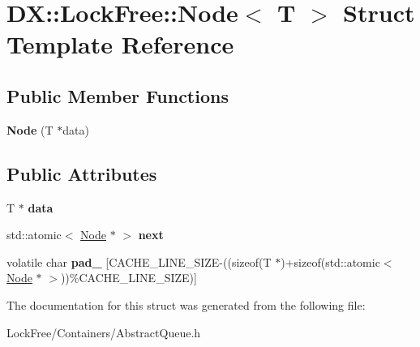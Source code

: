 \hypertarget{struct_d_x_1_1_lock_free_1_1_node}{\section{D\-X\-:\-:Lock\-Free\-:\-:Node$<$ T $>$ Struct Template Reference}
\label{struct_d_x_1_1_lock_free_1_1_node}
}
\subsection*{Public Member Functions}
\begin{DoxyCompactItemize}
\item 
\hypertarget{struct_d_x_1_1_lock_free_1_1_node_a2de3380e5423dc3d4edf17b33e1c4945}{{\bfseries Node} (T $\ast$data)}\label{struct_d_x_1_1_lock_free_1_1_node_a2de3380e5423dc3d4edf17b33e1c4945}

\end{DoxyCompactItemize}
\subsection*{Public Attributes}
\begin{DoxyCompactItemize}
\item 
\hypertarget{struct_d_x_1_1_lock_free_1_1_node_a42c6086397b8cbdecbc50095646d3b05}{T $\ast$ {\bfseries data}}\label{struct_d_x_1_1_lock_free_1_1_node_a42c6086397b8cbdecbc50095646d3b05}

\item 
\hypertarget{struct_d_x_1_1_lock_free_1_1_node_a8e86040f2e9bee28a7a736559cce086c}{std\-::atomic$<$ \hyperlink{struct_d_x_1_1_lock_free_1_1_node}{Node} $\ast$ $>$ {\bfseries next}}\label{struct_d_x_1_1_lock_free_1_1_node_a8e86040f2e9bee28a7a736559cce086c}

\item 
\hypertarget{struct_d_x_1_1_lock_free_1_1_node_a5773af1ce0c200ba7aa747b351b99bf4}{volatile char {\bfseries pad\-\_\-} \mbox{[}C\-A\-C\-H\-E\-\_\-\-L\-I\-N\-E\-\_\-\-S\-I\-Z\-E-\/((sizeof(T $\ast$)+sizeof(std\-::atomic$<$ \hyperlink{struct_d_x_1_1_lock_free_1_1_node}{Node} $\ast$ $>$))\%C\-A\-C\-H\-E\-\_\-\-L\-I\-N\-E\-\_\-\-S\-I\-Z\-E)\mbox{]}}\label{struct_d_x_1_1_lock_free_1_1_node_a5773af1ce0c200ba7aa747b351b99bf4}

\end{DoxyCompactItemize}


The documentation for this struct was generated from the following file\-:\begin{DoxyCompactItemize}
\item 
Lock\-Free/\-Containers/Abstract\-Queue.\-h\end{DoxyCompactItemize}
